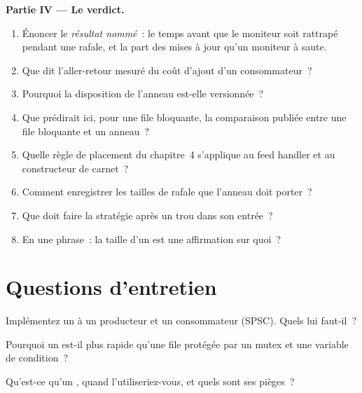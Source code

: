 \begin{problem}
\medskip\noindent\textbf{Partie IV --- Le verdict.}
\begin{enumerate}[resume]
\item Énoncer le \emph{résultat nommé}~: le temps avant que le moniteur soit rattrapé pendant une rafale, et la part des mises à jour qu'un moniteur à
 saute.
\item Que dit l'aller-retour mesuré du coût d'ajout d'un consommateur~?
\item Pourquoi la disposition de l'anneau est-elle versionnée~?
\item Que prédirait ici, pour une file bloquante, la comparaison publiée entre une file bloquante et un anneau~?
\item Quelle règle de placement du chapitre~4 s'applique au feed handler et au constructeur de carnet~?
\item Comment enregistrer les tailles de rafale que l'anneau doit porter~?
\item Que doit faire la stratégie après un trou dans son entrée~?
\item En une phrase~: la taille d'un  est une affirmation sur quoi~?
\end{enumerate}
\end{problem}

\section{Questions d'entretien}

\begin{interviewq}\label{iq:ll:queues-ring-buffers-and-shared-memory:1}
Implémentez un  à un producteur et un consommateur (SPSC). Quels  lui faut-il~?
\end{interviewq}

\begin{interviewq}\label{iq:ll:queues-ring-buffers-and-shared-memory:2}
Pourquoi un  est-il plus rapide qu'une file protégée par un mutex et une variable de condition~?
\end{interviewq}

\begin{interviewq}\label{iq:ll:queues-ring-buffers-and-shared-memory:3}
Qu'est-ce qu'un , quand l'utiliseriez-vous, et quels sont ses pièges~?
\end{interviewq}

